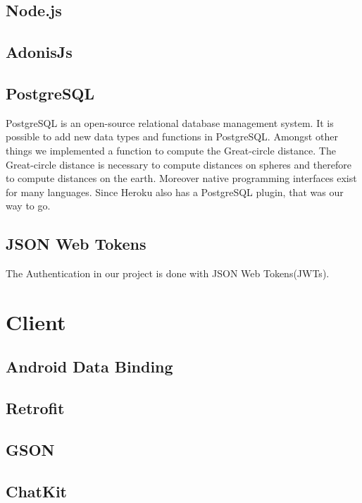 \documentclass[11pt, accentcolor=tud1c]{tudreport}
\begin{document}
\subsection{Node.js}
\cite{nodejs}
\subsection{AdonisJs}\label{sec:adonisjs}
\cite{adonisjs}
\subsection{PostgreSQL}
PostgreSQL\cite{postgresql} is an open-source relational database management system. It is possible to add new data types and functions in PostgreSQL. Amongst other things we implemented a function to compute the Great-circle distance\cite{greatcircledist}. The Great-circle distance is necessary to compute distances on spheres and therefore to compute distances on the earth. Moreover native programming interfaces exist for many languages. Since Heroku also has a PostgreSQL plugin, that was our way to go.
\subsection{JSON Web Tokens}\label{sec:json_web_tokens}
The Authentication in our project is done with JSON Web Tokens(JWTs)\cite{jwt}.

\section{Client}\label{sec:client}
\subsection{Android Data Binding}
\cite{databinding}
\subsection{Retrofit}
\cite{retrofit}
\subsection{GSON}
\cite{gson}
\subsection{ChatKit}
\cite{chatkit}

\end{document}
